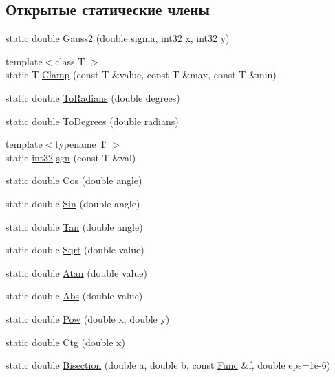 \subsection*{Открытые статические члены}
\begin{DoxyCompactItemize}
\item 
static double \hyperlink{class_math_aaa5990513ee0c895f9afd7db51842c5a}{Gauss2} (double sigma, \hyperlink{number_8h_a43d43196463bde49cb067f5c20ab8481}{int32} x, \hyperlink{number_8h_a43d43196463bde49cb067f5c20ab8481}{int32} y)
\item 
{\footnotesize template$<$class T $>$ }\\static T \hyperlink{class_math_a827e8a0ff76d6f12323a35fbf2e39ea3}{Clamp} (const T \&value, const T \&max, const T \&min)
\item 
static double \hyperlink{class_math_a937c65c4813b70c8bb6b0d5b45cecc94}{To\+Radians} (double degrees)
\item 
static double \hyperlink{class_math_af1ca146882158b0a43cc096b743b8801}{To\+Degrees} (double radians)
\item 
{\footnotesize template$<$typename T $>$ }\\static \hyperlink{number_8h_a43d43196463bde49cb067f5c20ab8481}{int32} \hyperlink{class_math_ab92f58e6e1f930ada33edf8cdd8aa04b}{sgn} (const T \&val)
\item 
static double \hyperlink{class_math_aeb7a861041c7e48f6c0e40a4465d9992}{Cos} (double angle)
\item 
static double \hyperlink{class_math_aaddefccaf14ac8f30d74d1a833a368dc}{Sin} (double angle)
\item 
static double \hyperlink{class_math_a60c35e7a78112bb4a5b30b5f409801e3}{Tan} (double angle)
\item 
static double \hyperlink{class_math_acfac5c3b87f409148813a851b1d8c53e}{Sqrt} (double value)
\item 
static double \hyperlink{class_math_acd6df1f0a16f26405026b7840eaf0237}{Atan} (double value)
\item 
static double \hyperlink{class_math_aad545cc846717f163d9bd06db85482b6}{Abs} (double value)
\item 
static double \hyperlink{class_math_a6b6041a5df8989cd65d28aedd5132236}{Pow} (double x, double y)
\item 
static double \hyperlink{class_math_aa6244486e13c3f04c1520cda7e9441b9}{Ctg} (double x)
\item 
static double \hyperlink{class_math_aef8d43dd2175c684297b6226192a54f4}{Bisection} (double a, double b, const \hyperlink{class_math_ab9fef5c7ba3bd81d13008e8a36abc655}{Func} \&f, double eps=1e-\/6)
\end{DoxyCompactItemize}

